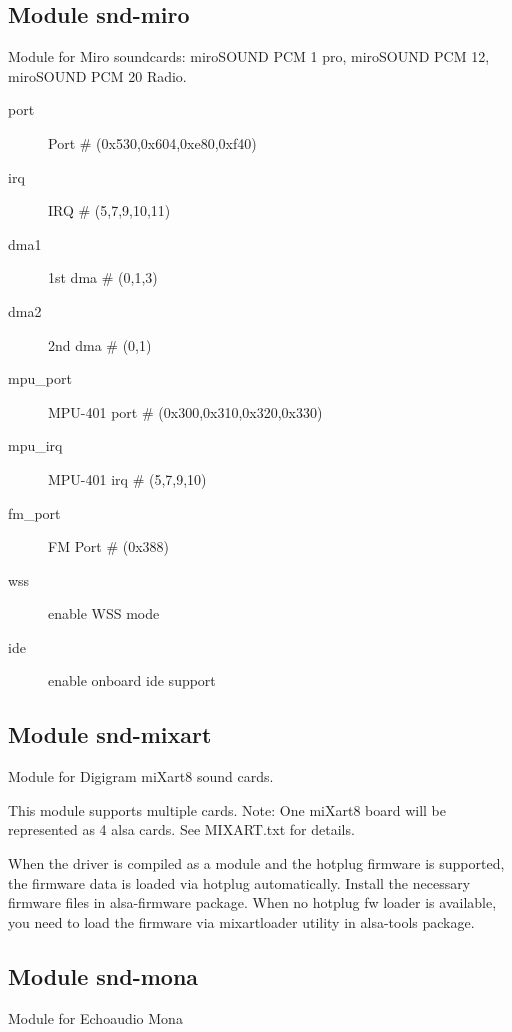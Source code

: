 \documentclass[a4paper,8pt,english]{sphinxmanual}
\begin{document}
\subsection{Module snd-miro}
\label{sound/alsa-configuration:module-snd-miro}
Module for Miro soundcards: miroSOUND PCM 1 pro, miroSOUND PCM 12,
miroSOUND PCM 20 Radio.
\begin{description}
\item[{port}] \leavevmode
Port \# (0x530,0x604,0xe80,0xf40)

\item[{irq}] \leavevmode
IRQ \# (5,7,9,10,11)

\item[{dma1}] \leavevmode
1st dma \# (0,1,3)

\item[{dma2}] \leavevmode
2nd dma \# (0,1)

\item[{mpu\_port}] \leavevmode
MPU-401 port \# (0x300,0x310,0x320,0x330)

\item[{mpu\_irq}] \leavevmode
MPU-401 irq \# (5,7,9,10)

\item[{fm\_port}] \leavevmode
FM Port \# (0x388)

\item[{wss}] \leavevmode
enable WSS mode

\item[{ide}] \leavevmode
enable onboard ide support

\end{description}


\subsection{Module snd-mixart}
\label{sound/alsa-configuration:module-snd-mixart}
Module for Digigram miXart8 sound cards.

This module supports multiple cards.
Note: One miXart8 board will be represented as 4 alsa cards.
See MIXART.txt for details.

When the driver is compiled as a module and the hotplug firmware
is supported, the firmware data is loaded via hotplug automatically.
Install the necessary firmware files in alsa-firmware package.
When no hotplug fw loader is available, you need to load the
firmware via mixartloader utility in alsa-tools package.


\subsection{Module snd-mona}
\label{sound/alsa-configuration:module-snd-mona}
Module for Echoaudio Mona
\end{document}

